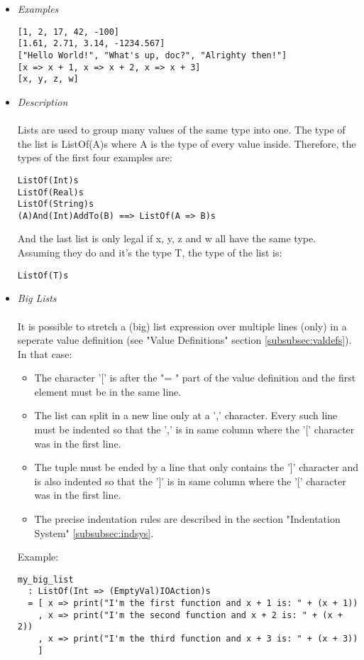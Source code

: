 \documentclass{article}
\begin{document}
\begin{itemize}

\item \textit{Examples}
\begin{verbatim}
[1, 2, 17, 42, -100]
[1.61, 2.71, 3.14, -1234.567]
["Hello World!", "What's up, doc?", "Alrighty then!"]
[x => x + 1, x => x + 2, x => x + 3]
[x, y, z, w]
\end{verbatim}

\item \textit{Description} \\\\
Lists are used to group many values of the same type into one. 
The type of the list is ListOf(A)s where A is the type of every value inside.
Therefore, the types of the first four examples are:
\begin{verbatim}
ListOf(Int)s
ListOf(Real)s
ListOf(String)s
(A)And(Int)AddTo(B) ==> ListOf(A => B)s
\end{verbatim}
And the last list is only legal if x, y, z and w all have the same type. Assuming 
they do and it's the type T, the type of the list is: 
\begin{verbatim}
ListOf(T)s
\end{verbatim}

\item \textit{Big Lists} \\\\
It is possible to stretch a (big) list expression over multiple lines (only) in
a seperate value definition (see "Value Definitions" section
\ref{subsubsec:valdefs}).  In that case:
\begin{itemize}
\item
The character '[' is after the "= " part of the value definition
and the first element must be in the same line.

\item
The list can split in a new line only at a ',' character. Every such line must
be indented so that the ',' is in same column where the '[' character was in
the first line.

\item
The tuple must be ended by a line that only contains the ']' character and is 
also indented so that the ']' is in same column where the '[' character was in
the first line.

\item
The precise indentation rules are described in the section
"Indentation System" \ref{subsubsec:indsys}.
\end{itemize}
Example:
\begin{verbatim}
my_big_list
  : ListOf(Int => (EmptyVal)IOAction)s
  = [ x => print("I'm the first function and x + 1 is: " + (x + 1))
    , x => print("I'm the second function and x + 2 is: " + (x + 2))
    , x => print("I'm the third function and x + 3 is: " + (x + 3))
    ]
\end{verbatim}


\end{itemize}
\end{document}
